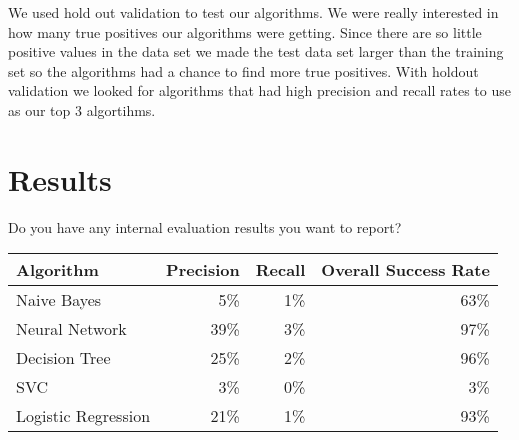 \documentclass[11pt,a4paper]{article}
\begin{document}
		We used hold out validation to test our algorithms.
		We were really interested in how many true positives our algorithms were getting.
		Since there are so little positive values in the data set we made the test data set larger than the training set so the algorithms had a chance to find more true positives.
		With holdout validation we looked for algorithms that had high precision and recall rates to use as our top 3 algortihms.

\section{Results}
	Do you have any internal evaluation results you want to report?

	\begin{tabular}{ | l | r | r | r | }
		\hline
		Algorithm & Precision & Recall & Overall Success Rate \\
		\hline
		Naive Bayes & 5\% & 1\% & 63\% \\
		\hline
		Neural Network & 39\% & 3\% & 97\% \\
		\hline
		Decision Tree & 25\% & 2\% & 96\% \\
		\hline
		SVC & 3\% & 0\% & 3\% \\
		\hline
		Logistic Regression & 21\% & 1\% & 93\% \\
		\hline
	\end{tabular}
\end{document}
